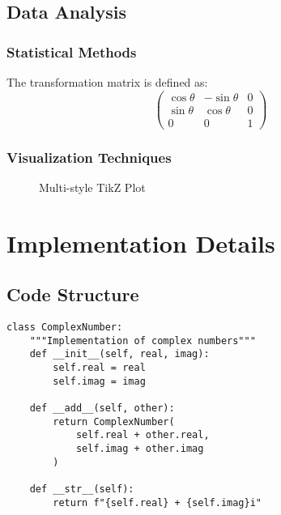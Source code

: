 \subsection{Data Analysis}
\label{subsec:analysis}

\subsubsection{Statistical Methods}
The transformation matrix is defined as:
\[
\begin{pmatrix}
\cos\theta & -\sin\theta & 0 \\
\sin\theta & \cos\theta & 0 \\
0 & 0 & 1
\end{pmatrix}
\]

\subsubsection{Visualization Techniques}
\label{subsubsec:visualization}

\begin{figure}[h]
\centering
{}
\caption{Multi-style TikZ Plot}
\label{fig:graph}
\end{figure}

\section{Implementation Details}
\label{sec:implementation}

\subsection{Code Structure}
\label{subsec:code}

\begin{lstlisting}
class ComplexNumber:
    """Implementation of complex numbers"""
    def __init__(self, real, imag):
        self.real = real
        self.imag = imag
    
    def __add__(self, other):
        return ComplexNumber(
            self.real + other.real,
            self.imag + other.imag
        )
    
    def __str__(self):
        return f"{self.real} + {self.imag}i"
\end{lstlisting}

